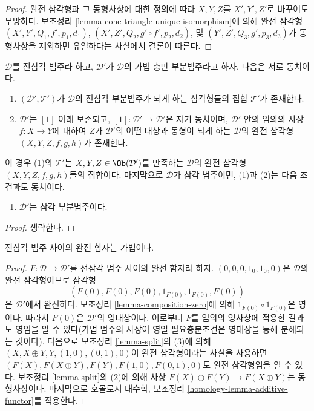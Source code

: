 \begin{proof}
완전 삼각형과 그 동형사상에 대한 정의에 따라 $X, Y, Z$를
$X', Y', Z'$로 바꾸어도 무방하다. 보조정리
\ref{lemma-cone-triangle-unique-isomorphism}에 의해 완전 삼각형
$(X', Y', Q_1, f', p_1, d_1)$,
$(X', Z', Q_2, g' \circ f', p_2, d_2)$,
및
$(Y', Z', Q_3, g', p_3, d_3)$가 동형사상을 제외하면 유일하다는
사실에서 결론이 따른다.
\end{proof}

\begin{lemma}
\label{lemma-triangulated-subcategory}
$\mathcal{D}$를 전삼각 범주라 하고, $\mathcal{D}'$가
$\mathcal{D}$의 가법 충만 부분범주라고 하자. 다음은 서로 동치이다.
\begin{enumerate}
\item $(\mathcal{D}', \mathcal{T}')$가 $\mathcal{D}$의 전삼각
부분범주가 되게 하는 삼각형들의 집합 $\mathcal{T}'$가 존재한다.
\item $\mathcal{D}'$는 $[1]$ 아래 보존되고,
$[1] : \mathcal{D}' \to \mathcal{D}'$은 자기 동치이며,
$\mathcal{D}'$ 안의 임의의 사상 $f : X \to Y$에 대하여
$Z$가 $\mathcal{D}'$의 어떤 대상과 동형이 되게 하는
$\mathcal{D}$의 완전 삼각형 $(X, Y, Z, f, g, h)$가 존재한다.
\end{enumerate}
이 경우 (1)의 $\mathcal{T}'$는 $X, Y, Z \in \Ob(\mathcal{D}')$를
만족하는 $\mathcal{D}$의 완전 삼각형 $(X, Y, Z, f, g, h)$들의 집합이다.
마지막으로 $\mathcal{D}$가 삼각 범주이면, (1)과 (2)는 다음 조건과도
동치이다.
\begin{enumerate}
\item[(3)] $\mathcal{D}'$는 삼각 부분범주이다.
\end{enumerate}
\end{lemma}

\begin{proof}
생략한다.
\end{proof}

\begin{lemma}
\label{lemma-exact-functor-additive}
전삼각 범주 사이의 완전 함자는 가법이다.
\end{lemma}

\begin{proof}
$F : \mathcal{D} \to \mathcal{D}'$를 전삼각 범주 사이의 완전 함자라 하자.
$(0, 0, 0, 1_0, 1_0, 0)$은 $\mathcal{D}$의 완전 삼각형이므로 삼각형
$$
(F(0), F(0), F(0), 1_{F(0)}, 1_{F(0)}, F(0))
$$
은 $\mathcal{D}'$에서 완전하다. 보조정리
\ref{lemma-composition-zero}에 의해 $1_{F(0)} \circ 1_{F(0)}$은 영이다.
따라서 $F(0)$은 $\mathcal{D}'$의 영대상이다. 이로부터 $F$를 임의의
영사상에 적용한 결과도 영임을 알 수 있다(가법 범주의 사상이 영일
필요충분조건은 영대상을 통해 분해되는 것이다). 다음으로 보조정리
\ref{lemma-split}의 (3)에 의해
$(X, X \oplus Y, Y, (1, 0), (0, 1), 0)$이 완전 삼각형이라는 사실을
사용하면
$(F(X), F(X \oplus Y), F(Y), F(1, 0), F(0, 1), 0)$도
완전 삼각형임을 알 수 있다. 보조정리 \ref{lemma-split}의 (2)에 의해
사상 $F(X) \oplus F(Y) \to F(X \oplus Y)$는 동형사상이다.
마지막으로 호몰로지 대수학, 보조정리
\ref{homology-lemma-additive-functor}를 적용한다.
\end{proof}

